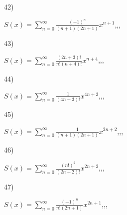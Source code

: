 \documentclass[11pt, ukrainian]{article}
\begin{document}
\par
\vspace{0.9cm}
42) \space 
{%
{$S(x)=\sum\limits_{n=0}^{\infty}{\frac{(-1)^n}{(n+1)(2n+1)}}{x^{{n+1}}}$},,, \par \smallskip  
}
\par
\vspace{0.9cm}
43) \space 
{%
{$S(x)=\sum\limits_{n=0}^{\infty}{\frac{(2n+3)!}{n!(n+4)!}}{x^{{n+4}}}$},,, \par \smallskip  
}
\par
\vspace{0.9cm}
44) \space 
{%
{$S(x)=\sum\limits_{n=0}^{\infty}{\frac{1}{(4n+3)!}}{x^{{4n+3}}}$},,, \par \smallskip  
}
\par
\vspace{0.9cm}
45) \space 
{%
{$S(x)=\sum\limits_{n=0}^{\infty}{\frac{1}{(n+1)(2n+1)}}{x^{{2n+2}}}$},,, \par \smallskip  
}
\par
\vspace{0.9cm}
46) \space 
{%
{$S(x)=\sum\limits_{n=0}^{\infty}{\frac{(n!)^2}{(2n+2)!}}{x^{{2n+2}}}$},,, \par \smallskip  
}
\par
\vspace{0.9cm}
47) \space 
{%
{$S(x)=\sum\limits_{n=0}^{\infty}{\frac{(-1)^n}{n!(2n+1)}}{x^{{2n+1}}}$},,, \par \smallskip  
}
\end{document}
